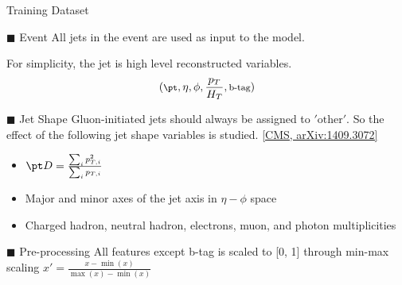 \begin{frame}[fragile]{Training Dataset}
  \begin{block}{$\blacksquare$ Event}
    \smallskip
    All jets in the event are used as input to the model.
    
    For simplicity, the jet is high level reconstructed variables.
    $$\footnotesize ({\pt}, \eta, \phi, \frac{p_{T}}{H_{T}}, \text{b-tag})$$
  \end{block}
  \begin{block}{$\blacksquare$ Jet Shape}
    Gluon-initiated jets should always be assigned to $'\text{other}'$.
    So the effect of the following jet shape variables is studied.
    \href{https://arxiv.org/abs/1409.3072}{[CMS, arXiv:1409.3072]}
    \begin{itemize}
      \item {\footnotesize ${\pt}D=\frac{ \sum_{i} p_{T,i}^{2} }{ \sum_{i} p_{T,i} }$}
      \item {\footnotesize Major and minor axes of the jet axis in $\eta-\phi$ space}
      \item {\footnotesize Charged hadron, neutral hadron, electrons, muon, and photon multiplicities}
    \end{itemize}
  \end{block}
  \begin{block}{$\blacksquare$ Pre-processing}
      {\footnotesize All features except b-tag is scaled to [0, 1]
      through min-max scaling $x'=\frac{x-\min({x})}{\max({x})-\min({x})}$}
  \end{block}
\end{frame}

